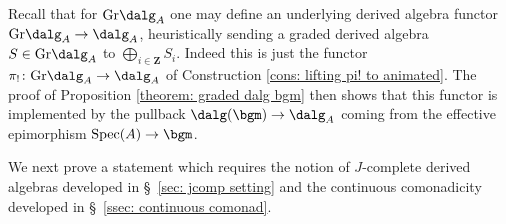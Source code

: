 \documentclass[10pt,reqno]{amsart}
\numberwithin{equation}{section}
\newcommand{\ZZ}{\mathbf{Z}}
\newcommand{\spec}{{\mathrm{Spec}}}
\newcommand{\Gr}{\mathrm{Gr}}
\begin{document}
\begin{remark}\label{remark: underlying algebra functor}

Recall that for $\Gr\dalg_A$ one may define an underlying derived algebra functor $\Gr\dalg_A\to \dalg_A$, heuristically sending a graded derived algebra $S\in \Gr\dalg_A$ to $\bigoplus_{i\in \ZZ}S_i.$ Indeed this is just the functor $\pi_!\colon \Gr\dalg_A\to \dalg_A$ of Construction \ref{cons: lifting pi! to animated}. 
The proof of Proposition \ref{theorem: graded dalg bgm} then shows that this functor is implemented by the pullback $\dalg(\bgm)\to \dalg_A$ coming from the effective epimorphism $\spec(A)\to \bgm$.
    
\end{remark}


We next prove a statement which requires the notion of $J$-complete derived algebras developed in \S~\ref{sec: jcomp setting} and the continuous comonadicity developed in  \S~\ref{ssec: continuous comonad}. 
\end{document}
